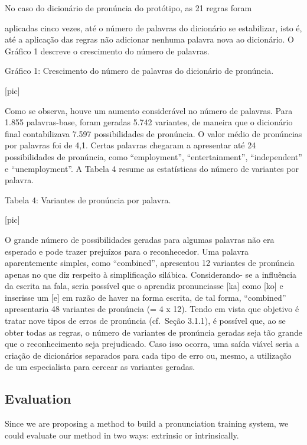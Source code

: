  No caso do dicion\'ario de pron\'uncia do prot\'otipo, as 21 regras foram

aplicadas cinco vezes, at\'e o n\'umero de palavras do dicion\'ario se
estabilizar, isto \'e, at\'e a aplica\c{c}\~ao das regras n\~ao adicionar nenhuma
palavra nova ao dicion\'ario. O Gr\'afico 1 descreve o crescimento do n\'umero
de palavras.

Gr\'afico 1: Crescimento do n\'umero de palavras do dicion\'ario de pron\'uncia.

 [pic]

Como se observa, houve um aumento consider\'avel no n\'umero de palavras.
Para 1.855 palavras-base, foram geradas 5.742 variantes, de maneira que
o dicion\'ario final contabilizava 7.597 possibilidades de pron\'uncia. O
valor m\'edio de pron\'uncias por palavras foi de 4,1. Certas palavras
chegaram a apresentar at\'e 24 possibilidades de pron\'uncia, como
``employment'', ``entertainment'', ``independent'' e ``unemployment''. A
Tabela 4 resume as estat\'isticas do n\'umero de variantes por palavra.

 Tabela 4: Variantes de pron\'uncia por palavra.

 [pic]

O grande n\'umero de possibilidades geradas para algumas palavras n\~ao era
esperado e pode trazer preju\'izos para o reconhecedor. Uma palavra
aparentemente simples, como ``combined'', apresentou 12 variantes de
pron\'uncia apenas no que diz respeito à simplifica\c{c}\~ao sil\'abica.
Considerando- se a influ\^encia da escrita na fala, seria poss\'ivel que o
aprendiz pronunciasse {[}ka{]} como {[}ko{]} e inserisse um {[}e{]} em
raz\~ao de haver na forma escrita, de tal forma, ``combined'' apresentaria
48 variantes de pron\'uncia (= 4 x 12). Tendo em vista que objetivo \'e
tratar nove tipos de erros de pron\'uncia (cf.~Se\c{c}\~ao 3.1.1), \'e poss\'ivel
que, ao se obter todas as regras, o n\'umero de variantes de pron\'uncia
geradas seja t\~ao grande que o reconhecimento seja prejudicado. Caso isso
ocorra, uma sa\'ida vi\'avel seria a cria\c{c}\~ao de dicion\'arios separados para
cada tipo de erro ou, mesmo, a utiliza\c{c}\~ao de um especialista para
cercear as variantes geradas.

\subsection{Evaluation}

Since we are proposing a method to build a pronunciation training system, we could
evaluate our method in two ways: extrinsic or intrinsically.

